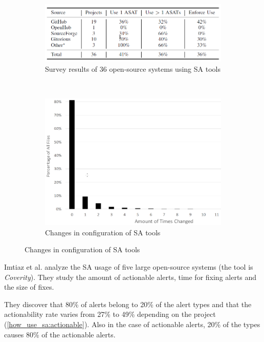  \begin{figure}[H]
     \begin{subfigure}{1\textwidth}
         \centering
         \includegraphics[scale=0.4]{./src/sa_analysis_survey_usage.png}
         \caption{Survey results of 36 open-source systems using SA tools}\label{sa_analysis_survey:usage}
     \end{subfigure}\\
     \begin{subfigure}{1\textwidth}
         \centering
         \includegraphics[scale=0.4]{./src/sa_analysis_survey_changes.png}
         \caption{Changes in configuration of SA tools}\label{sa_analysis_survey:changes}
     \end{subfigure}
 \end{figure}


 Imtiaz et al. \cite{how_act_sa} analyze the SA usage of five large open-source systems (the tool is \textit{Coverity}). They study the amount of actionable alerts, time for fixing alerts and the size of fixes.

 They discover that 80\% of alerts belong to 20\% of the alert types and that the actionability rate varies from 27\% to 49\% depending on the project (\cref{how_use_sa:actionable}). Also in the case of actionable alerts, 20\% of the types causes 80\% of the actionable alerts.

